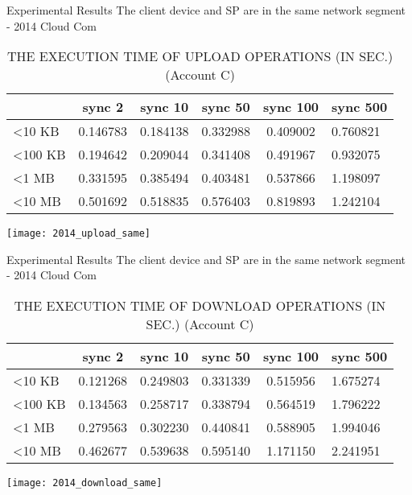 \begin{frame}{Experimental Results}
{The client device and SP are in the same network segment - 2014 Cloud Com}
	\scriptsize
    \begin{table}[]
    \centering
    \caption{THE EXECUTION TIME OF \alert{UPLOAD} OPERATIONS (IN SEC.) (Account C)}
    \begin{tabular}{lccccl}
                         & sync 2   & sync 10  & sync 50  & sync 100 & sync 500 \\ \hline
        \textless 10 KB  & 0.146783 & 0.184138 & 0.332988 & 0.409002 & 0.760821  \\ \hline
        \textless 100 KB & 0.194642 & 0.209044 & 0.341408 & 0.491967 & 0.932075  \\ \hline
        \textless 1 MB   & 0.331595 & 0.385494 & 0.403481 & 0.537866 & 1.198097  \\ \hline
        \textless 10 MB  & 0.501692 & 0.518835 & 0.576403 & 0.819893 & 1.242104  \\ \hline
    \end{tabular}
    \end{table}
    \begin{center}
		\texttt{[image: 2014\_upload\_same]}
    \end{center}
\end{frame}

\begin{frame}{Experimental Results}
{The client device and SP are in the same network segment - 2014 Cloud Com}
	\scriptsize
    \begin{table}[]
    \centering
    \caption{THE EXECUTION TIME OF \alert{DOWNLOAD} OPERATIONS (IN SEC.) (Account C)}
    \begin{tabular}{lccccl}
                         & sync 2   & sync 10  & sync 50  & sync 100 & sync 500  \\ \hline
        \textless 10 KB  & 0.121268 & 0.249803 & 0.331339 & 0.515956 & 1.675274  \\ \hline
        \textless 100 KB & 0.134563 & 0.258717 & 0.338794 & 0.564519 & 1.796222  \\ \hline
        \textless 1 MB   & 0.279563 & 0.302230 & 0.440841 & 0.588905 & 1.994046  \\ \hline
        \textless 10 MB  & 0.462677 & 0.539638 & 0.595140 & 1.171150 & 2.241951  \\ \hline
    \end{tabular}
    \end{table}
    \begin{center}
		\texttt{[image: 2014\_download\_same]}
    \end{center}
\end{frame}

